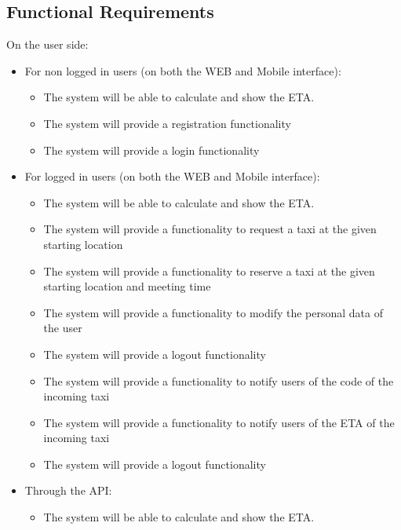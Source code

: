 \documentclass{article}
\begin{document}
\subsection{Functional Requirements}
On the user side:\@
\begin{itemize}
	\item For non logged in users (on both the WEB and Mobile interface):
		\begin{itemize}
			\item The system will be able to calculate and show the ETA.\@ 
			\item The system will provide a registration functionality 
			\item The system will provide a login functionality
		\end{itemize}
	\item For logged in users (on both the WEB and Mobile interface):
		\begin{itemize}
			\item The system will be able to calculate and show the ETA.\@ 
			\item The system will provide a functionality to request a taxi at the given starting location 
			\item The system will provide a functionality to reserve a taxi at the given starting location and meeting time
			\item The system will provide a functionality to modify the personal data of the user
			\item The system will provide a logout functionality
			\item The system will provide a functionality to notify users of the code of the incoming taxi
			\item The system will provide a functionality to notify users of the ETA of the incoming taxi
			\item The system will provide a logout functionality
		\end{itemize}
	\item Through the API:\@ %
		\begin{itemize}
			\item The system will be able to calculate and show the ETA.\@ 

\end{itemize}
\end{itemize}
\end{document}
